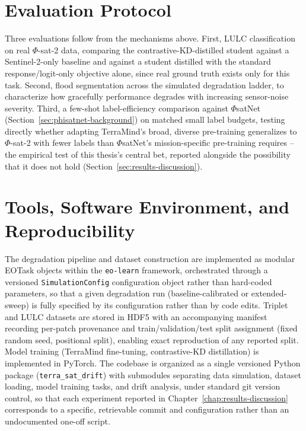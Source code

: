 \section{Evaluation Protocol}
\label{sec:evaluation-protocol}

Three evaluations follow from the mechanisms above.
First, LULC classification on real $\Phi$-sat-2 data, comparing the contrastive-KD-distilled student against a Sentinel-2-only baseline and against a student distilled with the standard response/logit-only objective alone, since real ground truth exists only for this task.
Second, flood segmentation across the simulated degradation ladder, to characterize how gracefully performance degrades with increasing sensor-noise severity.
Third, a few-shot label-efficiency comparison against $\Phi$satNet (Section~\ref{sec:phisatnet-background}) on matched small label budgets, testing directly whether adapting TerraMind's broad, diverse pre-training generalizes to $\Phi$-sat-2 with fewer labels than $\Phi$satNet's mission-specific pre-training requires -- the empirical test of this thesis's central bet, reported alongside the possibility that it does not hold (Section~\ref{sec:results-discussion}).

\section{Tools, Software Environment, and Reproducibility}
\label{sec:reproducibility}

The degradation pipeline and dataset construction are implemented as modular EOTask objects within the \texttt{eo-learn} framework, orchestrated through a versioned \texttt{SimulationConfig} configuration object rather than hard-coded parameters, so that a given degradation run (baseline-calibrated or extended-sweep) is fully specified by its configuration rather than by code edits.
Triplet and LULC datasets are stored in HDF5 with an accompanying manifest recording per-patch provenance and train/validation/test split assignment (fixed random seed, positional split), enabling exact reproduction of any reported split.
Model training (TerraMind fine-tuning, contrastive-KD distillation) is implemented in PyTorch.
The codebase is organized as a single versioned Python package (\texttt{terra\_sat\_drift}) with submodules separating data simulation, dataset loading, model training tasks, and drift analysis, under standard git version control, so that each experiment reported in Chapter~\ref{chap:results-discussion} corresponds to a specific, retrievable commit and configuration rather than an undocumented one-off script.
